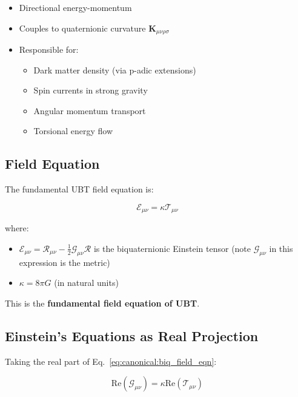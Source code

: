 \begin{itemize}
    \item Directional energy-momentum
    \item Couples to quaternionic curvature $\mathbf{K}_{\mu\nu\rho\sigma}$
    \item Responsible for:
    \begin{itemize}
        \item Dark matter density (via p-adic extensions)
        \item Spin currents in strong gravity
        \item Angular momentum transport
        \item Torsional energy flow
    \end{itemize}
\end{itemize}

\subsection{Field Equation}

The fundamental UBT field equation is:

\begin{equation}
\label{eq:canonical:biq_field_eqn}
\boxed{\mathcal{E}_{\mu\nu} = \kappa \mathcal{T}_{\mu\nu}}
\end{equation}

\noindent where:
\begin{itemize}
    \item $\mathcal{E}_{\mu\nu} = \mathcal{R}_{\mu\nu} - \frac{1}{2}\mathcal{G}_{\mu\nu}\mathcal{R}$ is the biquaternionic Einstein tensor (note $\mathcal{G}_{\mu\nu}$ in this expression is the metric)
    \item $\kappa = 8\pi G$ (in natural units)
\end{itemize}

This is the \textbf{fundamental field equation of UBT}.

\subsection{Einstein's Equations as Real Projection}

Taking the real part of Eq.~\ref{eq:canonical:biq_field_eqn}:

\begin{equation}
\text{Re}(\mathcal{G}_{\mu\nu}) = \kappa \text{Re}(\mathcal{T}_{\mu\nu})
\end{equation}

